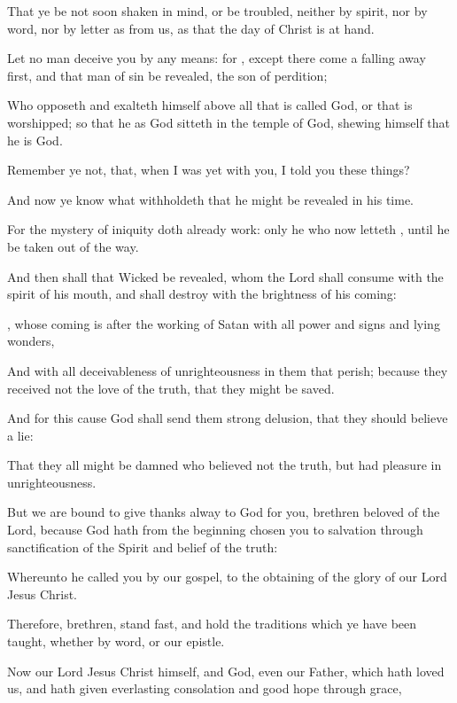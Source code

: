 {That
ye
be
not
soon
shaken
in
mind,
or be
troubled,
neither
by
spirit,
nor
by
word,
nor
by
letter
as
from
us,
as
that the
day of
Christ is at
hand.

Let
no
man
deceive
you
by
any
means:
for
{},
except there
come a falling
away
first,
and that
man of
sin be
revealed, the
son of
perdition;

Who
opposeth
and exalteth
himself
above
all that is
called
God,
or that is
worshipped; so
that
he
as
God
sitteth
in the
temple of
God,
shewing
himself
that he
is
God.

Remember
ye
not,
that, when I
was
yet
with
you, I
told
you these
things?

And
now ye
know what
withholdeth
that
he might be
revealed
in
his
time.

For the
mystery of
iniquity
doth
already
work:
only he
who
now
letteth
{},
until he be
taken out
of the
way.

And
then
shall that
Wicked be
revealed,
whom the
Lord shall
consume with the
spirit of
his
mouth,
and shall
destroy with the
brightness of
his
coming:

,
whose
coming
is
after the
working of
Satan
with
all
power
and
signs
and
lying
wonders,

And
with
all
deceivableness of
unrighteousness
in them that
perish;
because they
received
not the
love of the
truth,
that
they might be
saved.

And
for
this
cause
God shall
send
them
strong
delusion,
that
they should
believe a
lie:

That
they
all might be
damned who
believed
not the
truth,
but had
pleasure
in
unrighteousness.


\par }{\PP {}But
we are
bound to give
thanks
alway to
God
for
you,
brethren
beloved
of the
Lord,
because
God
hath
from the
beginning
chosen
you
to
salvation
through
sanctification of the
Spirit
and
belief of the
truth:

Whereunto he
called
you
by
our
gospel,
to the
obtaining of the
glory of
our
Lord
Jesus
Christ.

Therefore,
brethren, stand
fast,
and
hold the
traditions
which ye have been
taught,
whether
by
word,
or
our
epistle.

Now
our
Lord
Jesus
Christ
himself,
and
God,
even
our
Father, which hath
loved
us,
and hath
given
{}
everlasting
consolation
and
good
hope
through
grace,

}
